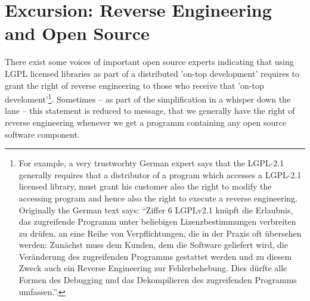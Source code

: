 %
%
%
%
%



\section{Excursion: Reverse Engineering and Open Source}

There exist some voices of important open source experts indicating that using
LGPL licensed libraries as part of a distributed 'on-top development' requires
to grant the right of reverse engineering to those who receive that 'on-top
develoment'\footnote{For example, a very trustworhty German expert says that the
LGPL-2.1 generally requires that a distributor of a program which accesses a
LGPL-2.1 licensed library, must grant his customer also the right to modify the
accessing program and hence also the right to execute a reverse engineering.
Originally the German text says: \enquote{Ziffer 6 LGPLv2.1 knüpft die
Erlaubnis, das zugreifende Programm unter beliebigen Lizenzbestimmungen
verbreiten zu drüfen, an eine Reihe von Verpflichtungen, die in der Praxis oft
übersehen werden: Zunächst muss dem Kunden, dem die Software geliefert wird, die
Veränderung des zugreifenden Programms gestattet werden und zu diesem Zweck auch
ein Reverse Engineering zur Fehlerbehebung. Dies dürfte alle Formen des
Debugging und das Dekompilieren des zugreifenden Programms
umfassen.}\cite[cf.][81]{JaeMet2011a}.}. Sometimes -- as part of the
simplification in a whisper down the lane -- this statement is reduced to
message, that we generally have the right of reverse engineering whenever we get
a programm containing any open source software component.


